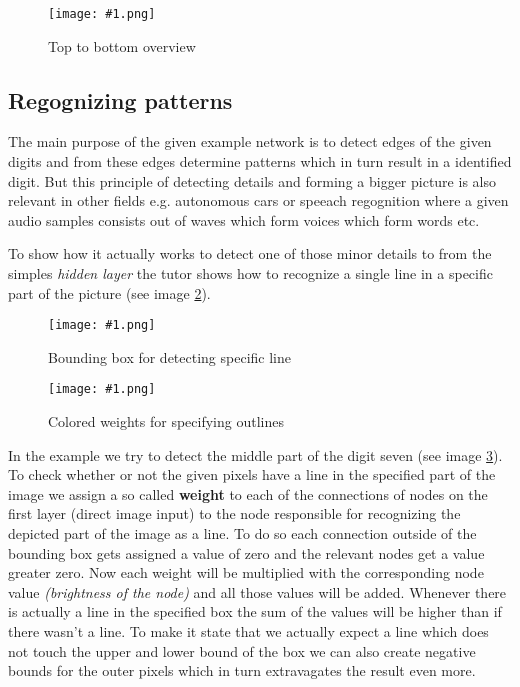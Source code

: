 \documentclass{article}
\newcommand{\lbl}[1]{(see image \ref{#1})}
\newcommand{\img}[1]{
	\centering
	\texttt{[image: \#1.png]}
	\label{#1}
}
\begin{document}
\begin{figure}[h]
\img{ai_6}
\caption{Top to bottom overview}
\end{figure}


\subsection{Regognizing patterns}
The main purpose of the given example network is to detect edges of the given digits and from these edges determine patterns which in turn result in a identified digit. But this principle of detecting details and forming a bigger picture is also relevant in other fields e.g. autonomous cars or speeach regognition where a given audio samples consists out of waves which form voices which form words etc. 

To show how it actually works to detect one of those minor details to from the simples \textit{hidden layer} the tutor shows how to recognize a single line in a specific part of the picture \lbl{ai_7}.

\begin{figure}[h]
\img{ai_7}
\caption{Bounding box for detecting specific line}
\end{figure}

\begin{figure}[h!]
\img{ai_8}
\caption{Colored weights for specifying outlines}
\end{figure}

In the example we try to detect the middle part of the digit seven \lbl{ai_8}. To check whether or not the given pixels have a line in the specified part of the image we assign a so called \textbf{weight} to each of the connections of nodes on the first layer (direct image input) to the node responsible for recognizing the depicted part of the image as a line. To do so each connection outside of the bounding box gets assigned a value of zero and the relevant nodes get a value greater zero. Now each weight will be multiplied with the corresponding node value \textit{(brightness of the node)} and all those values will be added. Whenever there is actually a line in the specified box the sum of the values will be higher than if there wasn't a line. To make it state that we actually expect a line which does not touch the upper and lower bound of the box we can also create negative bounds for the outer pixels which in turn extravagates the result even more. 
\end{document}
